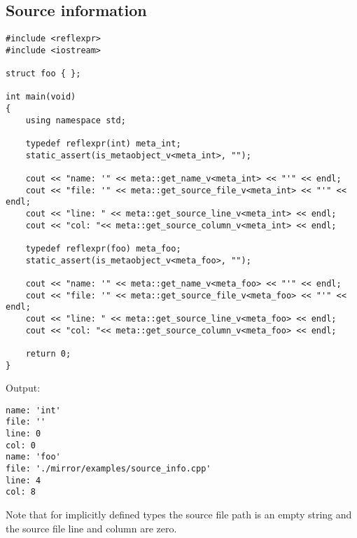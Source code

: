 \subsection{Source information}

\begin{verbatim}
#include <reflexpr>
#include <iostream>

struct foo { };

int main(void)
{
	using namespace std;

	typedef reflexpr(int) meta_int;
	static_assert(is_metaobject_v<meta_int>, "");

	cout << "name: '" << meta::get_name_v<meta_int> << "'" << endl;
	cout << "file: '" << meta::get_source_file_v<meta_int> << "'" << endl;
	cout << "line: " << meta::get_source_line_v<meta_int> << endl;
	cout << "col: "<< meta::get_source_column_v<meta_int> << endl;

	typedef reflexpr(foo) meta_foo;
	static_assert(is_metaobject_v<meta_foo>, "");

	cout << "name: '" << meta::get_name_v<meta_foo> << "'" << endl;
	cout << "file: '" << meta::get_source_file_v<meta_foo> << "'" << endl;
	cout << "line: " << meta::get_source_line_v<meta_foo> << endl;
	cout << "col: "<< meta::get_source_column_v<meta_foo> << endl;

	return 0;
}
\end{verbatim}

Output:

\begin{verbatim}
name: 'int'
file: ''
line: 0
col: 0
name: 'foo'
file: './mirror/examples/source_info.cpp'
line: 4
col: 8
\end{verbatim}

Note that for implicitly defined types the source file path is an empty string
and the source file line and column are zero.
